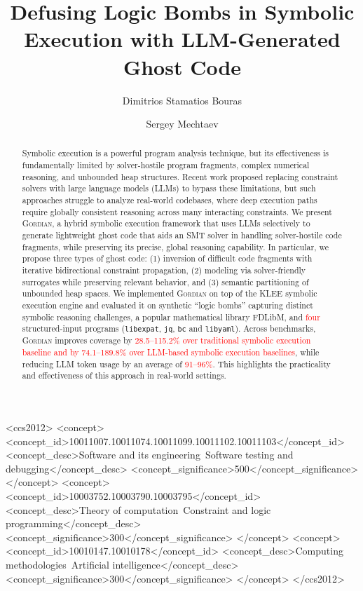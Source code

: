 \documentclass[acmsmall]{acmart}
\title{Defusing Logic Bombs in Symbolic Execution with LLM-Generated Ghost Code}
\author{Dimitrios Stamatios Bouras}
\affiliation{%
  \department{Key Lab of HCST (PKU), MoE and School of Computer Science}
  \institution{Peking University}
  \city{Beijing}
  \country{China}
}
\author{Sergey Mechtaev}
\affiliation{%
  \department{Key Lab of HCST (PKU), MoE and School of Computer Science}
  \institution{Peking University}
  \city{Beijing}
  \country{China}}
\newcommand{\rev}[1]{\textcolor{red}{#1}}
\newcommand{\rev}[1]{#1}
\newcommand{\projName}{\textsc{Gordian}\xspace}
\theoremstyle{definition}
\begin{document}
\begin{abstract}
    Symbolic execution is a powerful program analysis technique, but its effectiveness is fundamentally limited by solver-hostile program fragments, complex numerical reasoning, and unbounded heap structures. Recent work proposed replacing constraint solvers with large language models (LLMs) to bypass these limitations, but such approaches struggle to analyze real-world codebases, where deep execution paths require globally consistent reasoning across many interacting constraints. We present \projName, a hybrid symbolic execution framework that uses LLMs selectively to generate lightweight ghost code that aids an SMT solver in handling solver-hostile code fragments, while preserving its precise, global reasoning capability. In particular, we propose three types of ghost code: (1) inversion of difficult code fragments with iterative bidirectional constraint propagation, (2) modeling via solver-friendly surrogates while preserving relevant behavior, and (3) semantic partitioning of unbounded heap spaces. We implemented \projName on top of the KLEE symbolic execution engine and evaluated it on synthetic ``logic bombs'' capturing distinct symbolic reasoning challenges, a popular mathematical library FDLibM, and \rev{four} structured-input programs (\texttt{libexpat}, \texttt{jq}, \texttt{bc} and \texttt{libyaml}). Across benchmarks, \projName{} improves coverage by \rev{28.5--115.2\%  over traditional symbolic execution baseline and by 74.1--189.8\% over LLM-based symbolic execution baselines}, while reducing LLM token usage by an average of \rev{91--96\%}. This highlights the practicality and effectiveness of this approach in real-world settings.
\end{abstract}

\begin{CCSXML}
<ccs2012>
  <concept>
    <concept_id>10011007.10011074.10011099.10011102.10011103</concept_id>
    <concept_desc>Software and its engineering~Software testing and debugging</concept_desc>
    <concept_significance>500</concept_significance>
  </concept>
  <concept>
    <concept_id>10003752.10003790.10003795</concept_id>
    <concept_desc>Theory of computation~Constraint and logic programming</concept_desc>
    <concept_significance>300</concept_significance>
  </concept>
  <concept>
    <concept_id>10010147.10010178</concept_id>
    <concept_desc>Computing methodologies~Artificial intelligence</concept_desc>
    <concept_significance>300</concept_significance>
  </concept>
</ccs2012>
\end{CCSXML}
\end{document}
